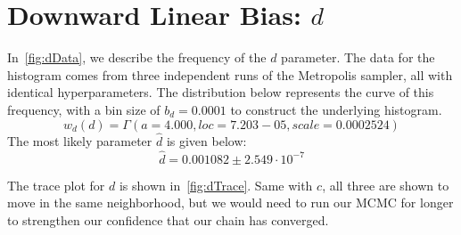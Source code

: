 \section{Downward Linear Bias: $d$}\label{sec:downwardLinearBias}

In~\autoref{fig:dData}, we describe the frequency of the $d$ parameter.
The data for the histogram comes from three independent runs of the Metropolis sampler, all with identical
hyperparameters.
The distribution below represents the curve of this frequency, with a bin size of $b_d = 0.0001$ to construct the
underlying histogram.
\begin{equation}
    w_d(d) = \Gamma(a = 4.000, \mathit{loc} = 7.203-05, \mathit{scale} = 0.0002524)
\end{equation}
The most likely parameter $\hat{d}$ is given below:
\begin{equation}
    \hat{d} = 0.001082 \pm 2.549 \cdot 10^{-7}
\end{equation}

The trace plot for $d$ is shown in~\autoref{fig:dTrace}.
Same with $c$, all three are shown to move in the same neighborhood, but we would need to run our MCMC for longer
to strengthen our confidence that our chain has converged.
